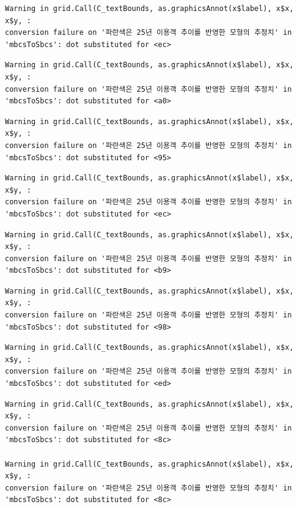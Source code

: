 \documentclass[
  letterpaper,
  DIV=11,
  numbers=noendperiod]{scrreprt}
\begin{document}
\begin{verbatim}
Warning in grid.Call(C_textBounds, as.graphicsAnnot(x$label), x$x, x$y, :
conversion failure on '파란색은 25년 이용객 추이를 반영한 모형의 추정치' in
'mbcsToSbcs': dot substituted for <ec>
\end{verbatim}

\begin{verbatim}
Warning in grid.Call(C_textBounds, as.graphicsAnnot(x$label), x$x, x$y, :
conversion failure on '파란색은 25년 이용객 추이를 반영한 모형의 추정치' in
'mbcsToSbcs': dot substituted for <a0>
\end{verbatim}

\begin{verbatim}
Warning in grid.Call(C_textBounds, as.graphicsAnnot(x$label), x$x, x$y, :
conversion failure on '파란색은 25년 이용객 추이를 반영한 모형의 추정치' in
'mbcsToSbcs': dot substituted for <95>
\end{verbatim}

\begin{verbatim}
Warning in grid.Call(C_textBounds, as.graphicsAnnot(x$label), x$x, x$y, :
conversion failure on '파란색은 25년 이용객 추이를 반영한 모형의 추정치' in
'mbcsToSbcs': dot substituted for <ec>
\end{verbatim}

\begin{verbatim}
Warning in grid.Call(C_textBounds, as.graphicsAnnot(x$label), x$x, x$y, :
conversion failure on '파란색은 25년 이용객 추이를 반영한 모형의 추정치' in
'mbcsToSbcs': dot substituted for <b9>
\end{verbatim}

\begin{verbatim}
Warning in grid.Call(C_textBounds, as.graphicsAnnot(x$label), x$x, x$y, :
conversion failure on '파란색은 25년 이용객 추이를 반영한 모형의 추정치' in
'mbcsToSbcs': dot substituted for <98>
\end{verbatim}

\begin{verbatim}
Warning in grid.Call(C_textBounds, as.graphicsAnnot(x$label), x$x, x$y, :
conversion failure on '파란색은 25년 이용객 추이를 반영한 모형의 추정치' in
'mbcsToSbcs': dot substituted for <ed>
\end{verbatim}

\begin{verbatim}
Warning in grid.Call(C_textBounds, as.graphicsAnnot(x$label), x$x, x$y, :
conversion failure on '파란색은 25년 이용객 추이를 반영한 모형의 추정치' in
'mbcsToSbcs': dot substituted for <8c>

Warning in grid.Call(C_textBounds, as.graphicsAnnot(x$label), x$x, x$y, :
conversion failure on '파란색은 25년 이용객 추이를 반영한 모형의 추정치' in
'mbcsToSbcs': dot substituted for <8c>
\end{verbatim}
\end{document}
